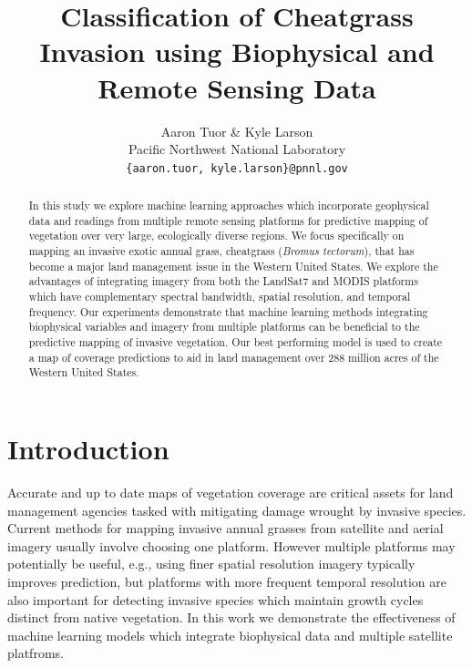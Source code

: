 \documentclass{article} %
\title{Classification of Cheatgrass Invasion using Biophysical and Remote Sensing Data}
\author{Aaron Tuor  \& Kyle Larson \\
Pacific Northwest National Laboratory\\
\texttt{\{aaron.tuor, kyle.larson\}@pnnl.gov}}
\begin{document}
    \maketitle

\begin{abstract} 
In this study we explore machine learning approaches which incorporate geophysical data and readings from multiple remote sensing platforms  for predictive mapping of vegetation over very large, ecologically diverse regions. 
We focus specifically on mapping an invasive exotic annual grass, cheatgrass ({\em Bromus tectorum}), that has become a major land management issue in the Western United States. We explore the advantages of integrating imagery from both the LandSat7 and MODIS platforms which have complementary spectral bandwidth, spatial resolution, and temporal frequency. Our experiments demonstrate that machine learning methods integrating biophysical variables and imagery from multiple platforms can be beneficial to the predictive mapping of invasive vegetation. Our best performing model is used to create a map of coverage predictions to aid in land management over 288 million acres of the Western United States. 
 \end{abstract}

 \section{Introduction}
Accurate and up to date maps of vegetation coverage are critical assets for land management agencies tasked with mitigating damage wrought by invasive species. 
Current methods for mapping invasive annual grasses from satellite and aerial imagery usually involve choosing one platform. However multiple platforms may potentially be useful, e.g.,  using finer spatial resolution imagery typically improves prediction, but platforms with more frequent temporal resolution are also important for detecting invasive species which maintain growth cycles distinct from native vegetation. In this work we demonstrate the effectiveness of machine learning models which integrate biophysical data and multiple satellite platfroms.
\end{document}
